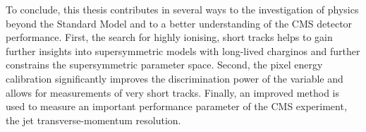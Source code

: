 To conclude, this thesis contributes in several ways to the investigation of physics beyond the Standard Model and to a better understanding of the CMS detector performance. 
First, the search for highly ionising, short tracks helps to gain further insights into supersymmetric models with long-lived charginos and further constrains the supersymmetric parameter space.
Second, the pixel energy calibration significantly improves the discrimination power of the variable \dedx and allows for \dedx measurements of very short tracks.
Finally, an improved method is used to  measure an important performance parameter of the CMS experiment, the jet transverse-momentum resolution.

